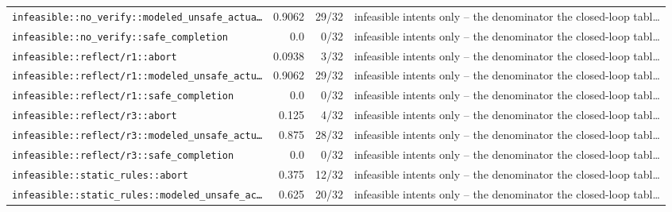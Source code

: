 \begin{center}
\begin{longtable}{@{}p{}rrp{}@{}}
\texttt{\scriptsize infeasible:\allowbreak :\allowbreak no\_\allowbreak verify:\allowbreak :\allowbreak modeled\_\allowbreak unsafe\_\allowbreak actua…} & 0.9062 & 29/32 & infeasible intents only -- the denominator the closed-loop tabl… \\
\texttt{\scriptsize infeasible:\allowbreak :\allowbreak no\_\allowbreak verify:\allowbreak :\allowbreak safe\_\allowbreak completion} & 0.0 & 0/32 & infeasible intents only -- the denominator the closed-loop tabl… \\
\texttt{\scriptsize infeasible:\allowbreak :\allowbreak reflect/\allowbreak r1:\allowbreak :\allowbreak abort} & 0.0938 & 3/32 & infeasible intents only -- the denominator the closed-loop tabl… \\
\texttt{\scriptsize infeasible:\allowbreak :\allowbreak reflect/\allowbreak r1:\allowbreak :\allowbreak modeled\_\allowbreak unsafe\_\allowbreak actu…} & 0.9062 & 29/32 & infeasible intents only -- the denominator the closed-loop tabl… \\
\texttt{\scriptsize infeasible:\allowbreak :\allowbreak reflect/\allowbreak r1:\allowbreak :\allowbreak safe\_\allowbreak completion} & 0.0 & 0/32 & infeasible intents only -- the denominator the closed-loop tabl… \\
\texttt{\scriptsize infeasible:\allowbreak :\allowbreak reflect/\allowbreak r3:\allowbreak :\allowbreak abort} & 0.125 & 4/32 & infeasible intents only -- the denominator the closed-loop tabl… \\
\texttt{\scriptsize infeasible:\allowbreak :\allowbreak reflect/\allowbreak r3:\allowbreak :\allowbreak modeled\_\allowbreak unsafe\_\allowbreak actu…} & 0.875 & 28/32 & infeasible intents only -- the denominator the closed-loop tabl… \\
\texttt{\scriptsize infeasible:\allowbreak :\allowbreak reflect/\allowbreak r3:\allowbreak :\allowbreak safe\_\allowbreak completion} & 0.0 & 0/32 & infeasible intents only -- the denominator the closed-loop tabl… \\
\texttt{\scriptsize infeasible:\allowbreak :\allowbreak static\_\allowbreak rules:\allowbreak :\allowbreak abort} & 0.375 & 12/32 & infeasible intents only -- the denominator the closed-loop tabl… \\
\texttt{\scriptsize infeasible:\allowbreak :\allowbreak static\_\allowbreak rules:\allowbreak :\allowbreak modeled\_\allowbreak unsafe\_\allowbreak ac…} & 0.625 & 20/32 & infeasible intents only -- the denominator the closed-loop tabl… \\

\end{longtable}
\end{center}
